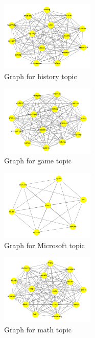 \documentclass[sigchi]{acmart}
\begin{document}
\begin{figure}[H]
  \centering
  \includegraphics[width=0.4\textwidth]{primo.png}
  \caption{Graph for history topic}
  \label{fig:immagine_history}
\end{figure}



\begin{figure}[H]
  \centering
  \includegraphics[width=0.4\textwidth]{secondo.png}
  \caption{Graph for game topic}
  \label{fig:immagine_game}
\end{figure}


\begin{figure}[H]
  \centering
  \includegraphics[width=0.4\textwidth]{terzo.png}
  \caption{Graph for Microsoft topic}
  \label{fig:immagine_mi}
\end{figure}

\begin{figure}[H]
  \centering
  \includegraphics[width=0.4\textwidth]{quarto.png}
  \caption{Graph for math topic}
  \label{fig:immagine_math}
\end{figure}
\end{document}
